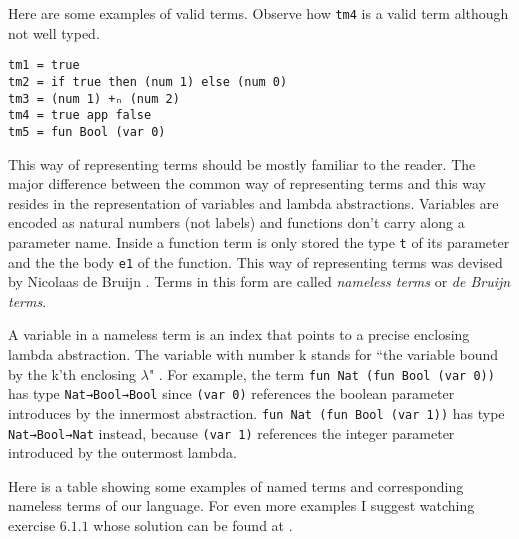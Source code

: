 \documentclass{article}
\begin{document}
Here are some examples of valid terms.
Observe how \texttt{tm4} is a valid term although not well typed.

\begin{verbatim}
tm1 = true
tm2 = if true then (num 1) else (num 0)
tm3 = (num 1) +ₙ (num 2)
tm4 = true app false
tm5 = fun Bool (var 0)
\end{verbatim}

This way of representing terms should be mostly familiar to the reader.
The major difference between the common way of representing terms and this way resides in the representation of variables and lambda abstractions.
Variables are encoded as natural numbers (not labels) and functions don't carry along a parameter name.
Inside a function term is only stored the type \texttt{t} of its parameter and the the body \texttt{e1} of the function.
This way of representing terms was devised by Nicolaas de Bruijn \cite[Ch.\ 6]{pierce}.
Terms in this form are called \textit{nameless terms} or \textit{de Bruijn terms}.

A variable in a nameless term is an index that points to a precise enclosing lambda abstraction.
The variable with number k stands for ``the variable bound by the k'th enclosing $\lambda$" \cite[Ch.\ 6 p.\ 76]{pierce}.
For example, the term \texttt{fun Nat (fun Bool (var 0))} has type \texttt{Nat→Bool→Bool} since \texttt{(var 0)} references the boolean parameter introduces by the innermost abstraction.
\texttt{fun Nat (fun Bool (var 1))} has type \texttt{Nat→Bool→Nat} instead, because \texttt{(var 1)} references the integer parameter introduced by the outermost lambda.


Here is a table showing some examples of named terms and corresponding nameless terms of our language.
For even more examples I suggest watching exercise $6.1.1$ \cite[p.\ 76]{pierce} whose solution can be found at \cite[p.\ 503]{pierce}.
\end{document}
